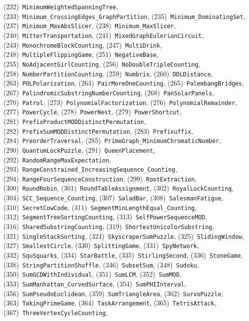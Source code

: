 \documentclass{article}
\theoremstyle{plain}
\theoremstyle{definition}
\theoremstyle{remark}
\begin{document}
\begin{flushleft}
(232)~\texttt{MinimumWeightedSpanningTree},
(233)~\texttt{Minimum\_CrossingEdges\_GraphPartition},
(235)~\texttt{Minimum\_DominatingSet},
(237)~\texttt{Minimum\_MaxAbsSlicer},
(238)~\texttt{Minimum\_MaxSlicer},
(240)~\texttt{MitterTransportation},
(241)~\texttt{MixedGraphEulerianCircuit},
(243)~\texttt{MonochromeBlockCounting},
(247)~\texttt{MultiDrink},
(248)~\texttt{MultipleFlippingGame},
(251)~\texttt{NegativeBase},
(255)~\texttt{NoAdjacentGirlCounting},
(256)~\texttt{NoDoubleTripleCounting},
(258)~\texttt{NumberPartitionCounting},
(259)~\texttt{Numbrix},
(260)~\texttt{ODLDistance},
(263)~\texttt{POLPolarization},
(264)~\texttt{PairMoreOneCounting},
(265)~\texttt{PalembangBridges},
(267)~\texttt{PalindromicSubstringNumberCounting},
(268)~\texttt{PanSolarPanels},
(270)~\texttt{Patrol},
(273)~\texttt{PolynomialFactorization},
(276)~\texttt{PolynomialRemainder},
(277)~\texttt{PowerCycle},
(278)~\texttt{PowerNest},
(279)~\texttt{PowerShortcut},
(281)~\texttt{PrefixProductMODDistinctPermutation},
(282)~\texttt{PrefixSumMODDistinctPermutation},
(283)~\texttt{Prefixuffix},
(284)~\texttt{PreorderTraversal},
(285)~\texttt{PrimeGraph\_MinimumChromaticNumber},
(290)~\texttt{QuantumLockPuzzle},
(291)~\texttt{QueenPlacement},
(292)~\texttt{RandomRangeMaxExpectation},
(293)~\texttt{RangeConstrained\_IncreasingSequence\_Counting},
(294)~\texttt{RangeFourSequenceConstruction},
(299)~\texttt{RootExtraction},
(300)~\texttt{RoundRobin},
(301)~\texttt{RoundTableAssignment},
(302)~\texttt{RoyalLockCounting},
(304)~\texttt{SCC\_Sequence\_Counting},
(307)~\texttt{SaladBar},
(308)~\texttt{SalesmanFatigue},
(310)~\texttt{SecretCowCode},
(311)~\texttt{SegmentMinLengthEqual\_Counting},
(312)~\texttt{SegmentTreeSortingCounting},
(313)~\texttt{SelfPowerSequenceMOD},
(316)~\texttt{SharedSubstringCounting},
(319)~\texttt{ShortestUnicolorSubstring},
(321)~\texttt{SingleStackSorting},
(324)~\texttt{SkyscraperSumPuzzle},
(325)~\texttt{SlidingWindow},
(327)~\texttt{SmallestCircle},
(330)~\texttt{SplittingGame},
(331)~\texttt{SpyNetwork},
(332)~\texttt{SquSquarks},
(334)~\texttt{StarBattle},
(335)~\texttt{StirlingSecond},
(336)~\texttt{StoneGame},
(338)~\texttt{StringPartitionShuffle},
(346)~\texttt{SubsetSum},
(348)~\texttt{Sudoku},
(350)~\texttt{SumGCDWithIndividual},
(351)~\texttt{SumLCM},
(352)~\texttt{SumMOD},
(353)~\texttt{SumManhattan\_CurvedSurface},
(354)~\texttt{SumPHIInterval},
(356)~\texttt{SumPseudoEuclidean},
(359)~\texttt{SumTriangleArea},
(362)~\texttt{SurvoPuzzle},
(363)~\texttt{TakingPrimeGame},
(364)~\texttt{TaskArrangement},
(365)~\texttt{TetrisAttack},
(367)~\texttt{ThreeVertexCycleCounting},

\end{flushleft}
\end{document}
